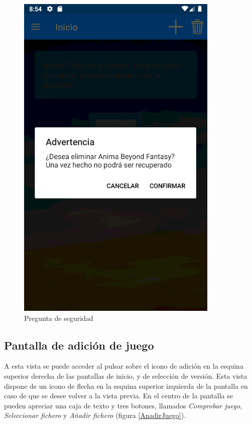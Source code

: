 \begin{figure}[H]
    \centering
    \includegraphics[scale=0.7]{Figures/Capturas/PreguntaSeguridad.png}
    \caption{Pregunta de seguridad}
    \label{PreguntaSeguridad}    
\end{figure}

\subsection{Pantalla de adición de juego}
A esta vista se puede acceder al pulsar sobre el icono de adición en la esquina superior derecha 
de las pantallas de inicio, y de selección de versión. Esta vista dispone de un icono de flecha en la esquina superior 
izquierda de la pantalla en caso de que se desee volver a la vista previa. En el centro de la pantalla se pueden apreciar 
una caja de texto y tres botones, llamados \textit{Comprobar juego}, \textit{Seleccionar fichero} y \textit{Añadir fichero} 
(figura \ref*{AnadirJuego}). 

